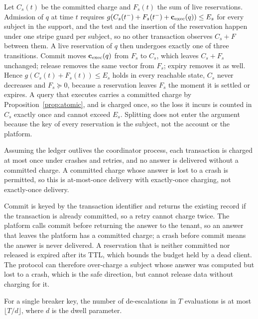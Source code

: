 \begin{IEEEproof}
Let $C_s(t)$ be the committed charge and $F_s(t)$ the sum of live reservations.
Admission of $q$ at time $t$ requires
$g(C_s(t^-)+F_s(t^-)+\mathbf{c}_{\mathrm{exec}}(q))\le E_s$ for every subject in the
support, and the test and the insertion of the reservation happen under one stripe
guard per subject, so no other transaction observes $C_s+F$ between them. A live
reservation of $q$ then undergoes exactly one of three transitions. Commit moves
$\mathbf{c}_{\mathrm{exec}}(q)$ from $F_s$ to $C_s$, which leaves $C_s+F_s$ unchanged;
release removes the same vector from $F_s$; expiry removes it as well. Hence
$g(C_s(t)+F_s(t))\le E_s$ holds in every reachable state, $C_s$ never decreases
and $F_s\succeq0$, because a reservation leaves $F_s$ the moment it is settled or
expires. A query that executes carries a committed charge by
Proposition~\ref{prop:atomic}, and is charged once, so the loss it incurs is
counted in $C_s$ exactly once and cannot exceed $E_s$. Splitting does not enter
the argument because the key of every reservation is the subject, not the account
or the platform.
\end{IEEEproof}

\begin{proposition}
\label{prop:atomic}
Assuming the ledger outlives the coordinator process, each transaction is charged at
most once under crashes and retries, and no answer is delivered without a committed
charge. A committed charge whose answer is lost to a crash is permitted, so this is
at-most-once delivery with exactly-once charging, not exactly-once delivery.
\end{proposition}

\begin{IEEEproof}
Commit is keyed by the transaction identifier and returns the existing record if
the transaction is already committed, so a retry cannot charge twice. The
platform calls commit before returning the answer to the tenant, so an answer
that leaves the platform has a committed charge; a crash before commit means the
answer is never delivered. A reservation that is neither committed nor released
is expired after its TTL, which bounds the budget held by a dead client. The
protocol can therefore over-charge a subject whose answer was computed but lost
to a crash, which is the safe direction, but cannot release data without
charging for it.
\end{IEEEproof}

\begin{proposition}
\label{prop:stability}
For a single breaker key, the number of de-escalations in $T$ evaluations is at
most $\lfloor T/d\rfloor$, where $d$ is the dwell parameter.
\end{proposition}

